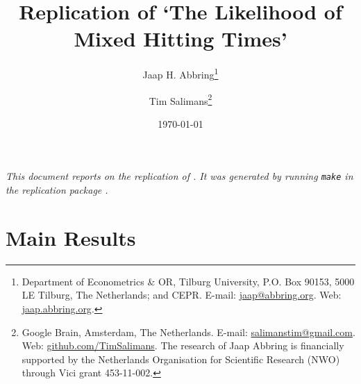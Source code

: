 \documentclass[fleqn,12pt]{article}
\begin{document}
\title{Replication of `The Likelihood of Mixed Hitting Times'}

\author{Jaap H. Abbring\thanks{%
Department of Econometrics \& OR, Tilburg University, P.O. Box 90153, 5000 LE Tilburg, The Netherlands; and CEPR. E-mail:
\href{mailto:jaap@abbring.org}{jaap@abbring.org}. Web: \href{http://jaap.abbring.org}{jaap.abbring.org}.}\and Tim Salimans\thanks{Google Brain, Amsterdam, The Netherlands. E-mail:
\href{mailto:salimanstim@gmail.com}{salimanstim@gmail.com}. Web: \href{http://github.com/TimSalimans}{github.com/TimSalimans}.
\newline The research of Jaap Abbring is financially supported by the Netherlands Organisation for Scientific Research (NWO) through Vici grant 453-11-002. 
}}

\date{\today}

\maketitle

{\em This document reports on the replication of \citet{jem21:abbringsalimans}. It was generated by running {\tt make} in the replication package \citep{zenodo21:abbringsalimans}.}

\section{Main Results}
\end{document}
